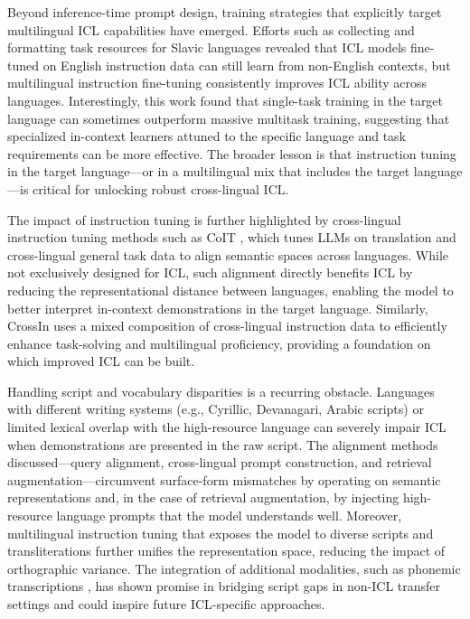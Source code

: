\documentclass[11pt]{article}
\begin{document}
Beyond inference-time prompt design, training strategies that explicitly target multilingual ICL capabilities have emerged. Efforts such as collecting and formatting task resources for Slavic languages \cite{ref131} revealed that ICL models fine-tuned on English instruction data can still learn from non-English contexts, but multilingual instruction fine-tuning consistently improves ICL ability across languages. Interestingly, this work found that single-task training in the target language can sometimes outperform massive multitask training, suggesting that specialized in-context learners attuned to the specific language and task requirements can be more effective. The broader lesson is that instruction tuning in the target language---or in a multilingual mix that includes the target language---is critical for unlocking robust cross-lingual ICL.

The impact of instruction tuning is further highlighted by cross-lingual instruction tuning methods such as CoIT \cite{ref132}, which tunes LLMs on translation and cross-lingual general task data to align semantic spaces across languages. While not exclusively designed for ICL, such alignment directly benefits ICL by reducing the representational distance between languages, enabling the model to better interpret in-context demonstrations in the target language. Similarly, CrossIn \cite{ref133} uses a mixed composition of cross-lingual instruction data to efficiently enhance task-solving and multilingual proficiency, providing a foundation on which improved ICL can be built.

Handling script and vocabulary disparities is a recurring obstacle. Languages with different writing systems (e.g., Cyrillic, Devanagari, Arabic scripts) or limited lexical overlap with the high-resource language can severely impair ICL when demonstrations are presented in the raw script. The alignment methods discussed---query alignment, cross-lingual prompt construction, and retrieval augmentation---circumvent surface-form mismatches by operating on semantic representations and, in the case of retrieval augmentation, by injecting high-resource language prompts that the model understands well. Moreover, multilingual instruction tuning that exposes the model to diverse scripts and transliterations further unifies the representation space, reducing the impact of orthographic variance. The integration of additional modalities, such as phonemic transcriptions \cite{ref134}, has shown promise in bridging script gaps in non-ICL transfer settings and could inspire future ICL-specific approaches.
\end{document}
